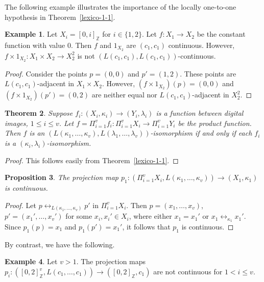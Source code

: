 \documentclass{article}
\theoremstyle{plain}
\newtheorem{thm}{Theorem}
\newtheorem{prop}[thm]{Proposition}
\theoremstyle{definition}
\newtheorem{exl}[thm]{Example}
\numberwithin{thm}{section}
\newcommand{\adj}{\leftrightarrow}
\def\Z{{\mathbb Z}}
\begin{document}
The following example illustrates
the importance of the locally
one-to-one hypothesis in
Theorem~\ref{lexico-1-1}.

\begin{exl}
\label{lexico-factor-not-implies-prod}
Let $X_i = [0,i]_{\Z}$ for
$i \in \{1,2\}$. Let
$f: X_1 \to X_2$ be the constant function with value $0$.
Then $f$ and $1_{X_2}$ are
$(c_1,c_1)$ continuous.
However, $f \times 1_{X_2}: X_1 \times X_2 \to X_2^2$ is not
$(L(c_1,c_1),L(c_1,c_1))$-continuous.
\end{exl}

\begin{proof}
Consider the points $p=(0,0)$ and $p'=(1,2)$. These points are
$L(c_1,c_1)$-adjacent in $X_1 \times X_2$. However,
$(f \times 1_{X_2})(p) = (0,0)$
and $(f \times 1_{X_2})(p') = (0,2)$ are neither equal nor
$L(c_1,c_1)$-adjacent in $X_2^2$.
\end{proof}

\begin{thm}
\label{L-iso}
Suppose $f_i: (X_i,\kappa_i) \to (Y_i,\lambda_i)$ is a function
between digital images, $1 \le i \le v$. Let $f=\Pi_{i=1}^v f_i: \Pi_{i=1}^v X_i \to \Pi_{i=1}^v Y_i$ be the product function.
Then $f$ is an
$(L(\kappa_1,\ldots,\kappa_v),L(\lambda_1,\ldots,\lambda_v))$-isomorphism if and
only if each $f_i$ is a
$(\kappa_i,\lambda_i)$-isomorphism.
\end{thm}

\begin{proof}
This follows easily from
Theorem~\ref{lexico-1-1}.
\end{proof}

\begin{prop}
The projection map
$p_1: (\Pi_{i=1}^v X_i, L(\kappa_1,\ldots,\kappa_v)) \to (X_1,\kappa_1)$ is continuous.
\end{prop}

\begin{proof}
Let $p \adj_{L(\kappa_1,\ldots,\kappa_v)} p'$ in $\Pi_{i=1}^v X_i$. Then 
$p=(x_1,\ldots,x_v)$,
$p'=(x_1',\ldots,x_v')$ for some
$x_i,x_i' \in X_i$, where
either $x_1=x_1'$ or $x_1 \adj_{\kappa_1} x_1'$. Since
$p_1(p)=x_1$ and $p_1(p')=x_1'$,
it follows that $p_1$ is continuous.
\end{proof}

By contrast, we have the following.

\begin{exl}
\label{L-projection-not-cont}
Let $v>1$. The projection maps
$p_i: ([0,2]_{\Z}^v,L(c_1,\ldots,c_1)) \to ([0,2]_{\Z},c_1)$ are not
continuous for $1<i\le v$.
\end{exl}
\end{document}
